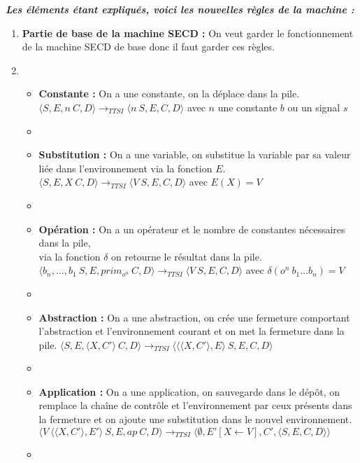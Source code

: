 \documentclass[10pt,a4paper]{report}
\begin{document}
	\textbf{\textit{Les éléments étant expliqués, voici les nouvelles règles de la machine :}}
	\smallbreak
	\begin{enumerate}
		\item[] \textbf{Partie de base de la machine SECD :} On veut garder le fonctionnement de la machine SECD de base donc il faut garder ces règles.	
		\item[]
		\begin{itemize}
			\item[] \textbf{Constante :} On a une constante, on la déplace dans la pile.
			\smallbreak
			$\langle S,E,n~C,D\rangle 
			\longrightarrow_{TTSI} 
			\langle n~S,E,C,D\rangle$ avec $n$ une constante $b$ ou un signal $s$
			\item[]
			
			\item[] \textbf{Substitution :} On a une variable, on substitue la variable par sa valeur liée dans l'environnement via la fonction $E$.
			\smallbreak
			$\langle S,E,X~C,D\rangle
			\longrightarrow_{TTSI} 
			\langle V~S,E,C,D\rangle$ avec $E(X) = V$
			\item[]
			
			\item[] \textbf{Opération :} On a un opérateur et le nombre de constantes nécessaires dans la pile, \\via la fonction $\delta$ on retourne le résultat dans la pile.
			\smallbreak
			$\langle b_{n},...,b_{1}~S,E,prim_{o^{n}}~C,D\rangle
			\longrightarrow_{TTSI} 
			\langle V~S,E,C,D\rangle$ avec $\delta(o^{n}~b_{1}...b_{n}) = V$
			\item[]
			
			\item[]  \textbf{Abstraction :} On a une abstraction, on crée une fermeture comportant l'abstraction et l'environnement courant et on met la fermeture dans la pile.
			\smallbreak
			$\langle S,E,\langle X,C'\rangle~C,D\rangle
			\longrightarrow_{TTSI} 
			\langle \langle\langle X,C'\rangle,E\rangle~S,E,C,D\rangle$
			\item[]
			
			\item[]  \textbf{Application :} On a une application, on sauvegarde dans le dépôt, on remplace la chaîne de contrôle et l'environnement par ceux présents dans la fermeture et on ajoute une substitution  dans le nouvel environnement.
			\smallbreak
			$\langle V~\langle\langle X,C'\rangle,E'\rangle~S,E,ap~C,D\rangle
			\longrightarrow_{TTSI} 
			\langle \emptyset,E'[X \leftarrow V],C',\langle S,E,C,D\rangle\rangle$
			\item[] 
			

\end{itemize}
\end{enumerate}
\end{document}
